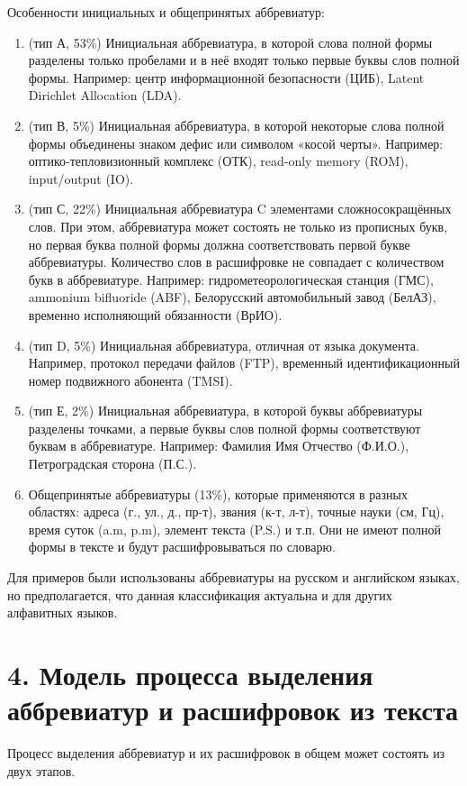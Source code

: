\documentclass{article}
\begin{document}
Особенности инициальных и общепринятых аббревиатур:
\begin{enumerate}
    \item (тип А, 53\%) Инициальная аббревиатура, в которой слова полной формы разделены только пробелами и в неё входят только первые буквы слов полной формы. Например: центр информационной безопасности (ЦИБ), Latent Dirichlet Allocation (LDA).
    \item (тип В, 5\%) Инициальная аббревиатура, в которой некоторые слова полной формы объединены знаком дефис или символом «косой черты». Например: оптико-тепловизионный комплекс (ОТК), read-only memory (ROM), input/output (IO).
    \item (тип С, 22\%) Инициальная аббревиатура C элементами сложносокращённых слов. При этом, аббревиатура может состоять не только из прописных букв, но первая буква полной формы должна соответствовать первой букве аббревиатуры. Количество слов в расшифровке не совпадает с количеством букв в аббревиатуре. Например: гидрометеорологическая станция (ГМС), ammonium bifluoride (ABF), Белорусский автомобильный завод (БелАЗ), временно исполняющий обязанности (ВрИО).
    \item (тип D, 5\%) Инициальная аббревиатура, отличная от языка документа. Например, протокол передачи файлов (FTP), временный идентификационный номер подвижного абонента (TMSI).
    \item (тип Е, 2\%) Инициальная аббревиатура, в которой буквы аббревиатуры разделены точками, а первые буквы слов полной формы соответствуют буквам в аббревиатуре. Например: Фамилия Имя Отчество (Ф.И.О.), Петроградская сторона (П.С.).

\newpage
\item Общепринятые аббревиатуры (13\%), которые применяются в разных областях: адреса (г., ул., д., пр-т), звания (к-т, л-т), точные науки (см, Гц), время суток (a.m, p.m), элемент текста (P.S.) и т.п. Они не имеют полной формы в тексте и будут расшифровываться по словарю.
\end{enumerate}
Для примеров были использованы аббревиатуры на русском и английском языках, но предполагается, что данная классификация актуальна и для других алфавитных языков.

\section*{4. Модель процесса выделения аббревиатур и расшифровок из текста}
Процесс выделения аббревиатур и их расшифровок в общем может состоять из двух этапов.
\end{document}

